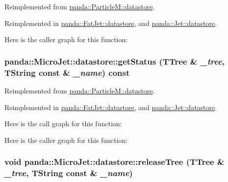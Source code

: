 Reimplemented from \hyperlink{structpanda_1_1ParticleM_1_1datastore_a85c4ce11f1d7c6944a525ad2488880aa}{panda::ParticleM::datastore}.

Reimplemented in \hyperlink{structpanda_1_1FatJet_1_1datastore_ae981e60d6fc142e3bbb4730a8a856fa7}{panda::FatJet::datastore}, and \hyperlink{structpanda_1_1Jet_1_1datastore_a606415eee51c1a38fc0613f3b2946d1e}{panda::Jet::datastore}.

Here is the caller graph for this function:\hypertarget{structpanda_1_1MicroJet_1_1datastore_ae893cdc52ad9ae8ffc8a8cea1cac1377}{
\subsubsection[{getStatus}]{ panda::MicroJet::datastore::getStatus (TTree \& {\em \_\-tree}, \/  TString const \& {\em \_\-name}) const}}
\label{structpanda_1_1MicroJet_1_1datastore_ae893cdc52ad9ae8ffc8a8cea1cac1377}


Reimplemented from \hyperlink{structpanda_1_1ParticleM_1_1datastore_a4069b8cdca5715ed6faf0a7907ea8386}{panda::ParticleM::datastore}.

Reimplemented in \hyperlink{structpanda_1_1FatJet_1_1datastore_a83669574414333b1656878e0ec09c345}{panda::FatJet::datastore}, and \hyperlink{structpanda_1_1Jet_1_1datastore_ac3a9ecd013ec5d5bf94f71ff013e5491}{panda::Jet::datastore}.

Here is the call graph for this function:

Here is the caller graph for this function:\hypertarget{structpanda_1_1MicroJet_1_1datastore_a9722ed3783e57fb5e55307d72ebddb15}{
\subsubsection[{releaseTree}]{\setlength{\rightskip}{0pt plus 5cm}void panda::MicroJet::datastore::releaseTree (TTree \& {\em \_\-tree}, \/  TString const \& {\em \_\-name})}}
\label{structpanda_1_1MicroJet_1_1datastore_a9722ed3783e57fb5e55307d72ebddb15}


